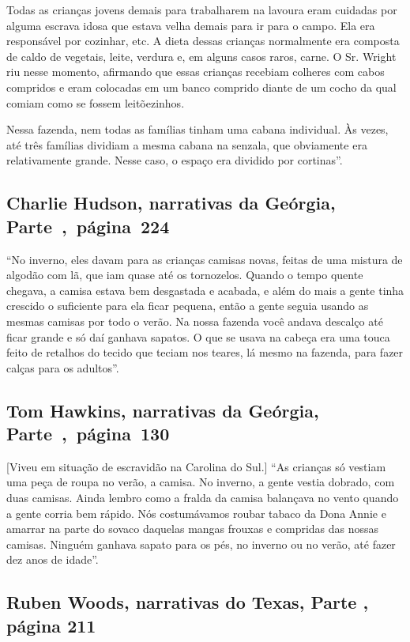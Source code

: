 Todas as crianças jovens demais para trabalharem na lavoura eram
cuidadas por alguma escrava idosa que estava velha demais para ir para o
campo. Ela era responsável por cozinhar, etc. A dieta dessas crianças
normalmente era composta de caldo de vegetais, leite, verdura e, em
alguns casos raros, carne. O Sr. Wright riu nesse momento, afirmando que
essas crianças recebiam colheres com cabos compridos e eram colocadas em
um banco comprido diante de um cocho da qual comiam como se fossem
leitõezinhos.

Nessa fazenda, nem todas as famílias tinham uma cabana individual. Às
vezes, até três famílias dividiam a mesma cabana na senzala, que
obviamente era relativamente grande. Nesse caso, o espaço era dividido
por cortinas''.

\subsection{Charlie Hudson, narrativas da Geórgia, Parte~,~página~224}
\label{ref149}

``No inverno, eles davam para as crianças camisas novas, feitas de uma
mistura de algodão com lã, que iam quase até os tornozelos. Quando o
tempo quente chegava, a camisa estava bem desgastada e acabada, e além
do mais a gente tinha crescido o suficiente para ela ficar pequena,
então a gente seguia usando as mesmas camisas por todo o verão. Na nossa
fazenda você andava descalço até ficar grande e só daí ganhava sapatos.
O que se usava na cabeça era uma touca feito de retalhos do tecido que
teciam nos teares, lá mesmo na fazenda, para fazer calças para os
adultos''.

\subsection{Tom Hawkins, narrativas da Geórgia, Parte~,~página~130}
\label{ref124}

{[}Viveu em situação de escravidão na Carolina do Sul.{]}
``As crianças só vestiam uma peça de roupa no verão, a camisa. No
inverno, a gente vestia dobrado, com duas camisas. Ainda lembro como a
fralda da camisa balançava no vento quando a gente corria bem rápido.
Nós costumávamos roubar tabaco da Dona Annie e amarrar na parte do
sovaco daquelas mangas frouxas e compridas das nossas camisas. Ninguém
ganhava sapato para os pés, no inverno ou no verão, até fazer dez anos
de idade''.

\subsection{Ruben Woods, narrativas do Texas, Parte , página 211}
\label{ref313}

